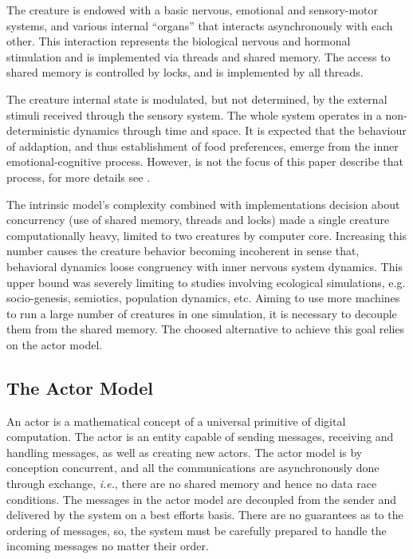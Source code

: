\documentclass{aamas2017}
\begin{document}
The creature is endowed with a basic nervous, emotional and sensory-motor systems, and various internal ``organs'' that interacts asynchronously with each other. This interaction represents the biological nervous and hormonal stimulation and is implemented via threads and shared memory. The access to shared memory is controlled by locks, and is implemented by all threads.

The creature internal state is modulated, but not determined, by the external stimuli received through the sensory system. The whole system operates in a non-deterministic dynamics through time and space. It is expected that the behaviour of addaption, and thus establishment of food preferences, emerge from the inner emotional-cognitive process. However, is not the focus of this paper describe that process, for more details see \cite{Campos}.

The intrinsic model's complexity combined with implementations decision about concurrency (use of shared memory, threads and locks) made a single creature computationally heavy, limited to two creatures by computer core. Increasing this number causes the creature behavior becoming incoherent in sense that, behavioral dynamics loose congruency with inner nervous system dynamics. This upper bound was severely limiting to studies involving ecological simulations, e.g. socio-genesis, semiotics, population dynamics, etc. Aiming to use more machines to run a large number of creatures in one simulation, it is necessary to decouple them from the shared memory. The choosed alternative to achieve this goal relies on the actor model.

\subsection{The Actor Model}
\label{subsec:actors}
An actor is a mathematical concept of a universal primitive of digital computation\cite{Hewitt2012}. The actor is an entity capable of sending messages, receiving and handling messages, as well as creating new actors. The actor model is by conception concurrent, and all the communications are asynchronously done through exchange, \textit{i.e.},  there are no shared memory and hence no data race conditions. The messages in the actor model are decoupled from the sender and delivered by the system on a best efforts basis\cite{Hewitt2014}. There are no guarantees as to the ordering of messages, so, the system must be carefully prepared to handle the incoming messages no matter their order.
\end{document}
